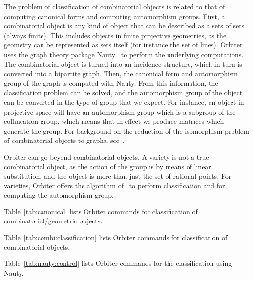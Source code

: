 

The problem of classification of combinatorial objects is related to that of computing canonical forms and computing automorphism groups. 
First, a combinatorial object is any kind of object that can be described as a sets of sets (always finite). 
This includes objects in finite projective geometries, as the geometry can be represented as sets itself (for instance the set of lines).
Orbiter uses the graph theory package Nauty~\cite{Nauty2020} to perform the underlying computations. 
The combinatorial object is turned into an incidence structure, which in turn is converted into a bipartite graph. 
Then, the canonical form and automorphism group of the graph is computed with Nauty. 
From this information, the classification problem can be solved, and the automorphism group of the object can be converted in the type of group that we expect. 
For instance, an object in projective space will have an automorphism group which is a subgroup of the collineation group, which means that in effect we produce matrices which generate the group.
For background on the reduction of the isomorphism problem of combinatorial objects to graphs, see~\cite{AlogaidiBetten}.


\bigskip

Orbiter can go beyond combinatorial objects. A variety is not a true combinatorial object, as the action of the group is by means of linear substitution, and the object is more than just the set of rational points. 
For varieties, Orbiter offers the algorithm of~\cite{AlazemiBetten2024} to perform classification and 
for computing the automorphism group.

\bigskip

Table~\ref{tab:canonical} lists Orbiter commands for classification of combinatorial/geometric objects.

Table~\ref{tab:combi:classification} lists Orbiter commands for classification of combinatorial objects.


Table~\ref{tab:nauty:control} lists Orbiter commands for the classification using Nauty.


